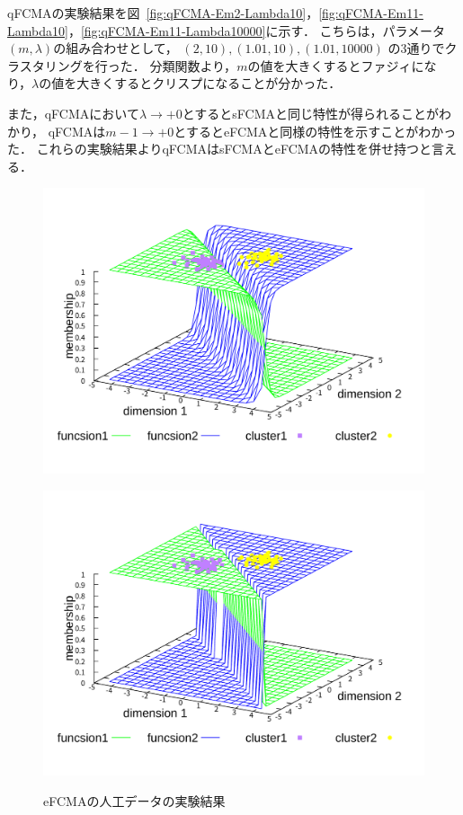 \documentclass[twocolumn, a4paper]{icethesisabst}
\begin{document}
qFCMAの実験結果を図~\ref{fig:qFCMA-Em2-Lambda10}，\ref{fig:qFCMA-Em11-Lambda10}，\ref{fig:qFCMA-Em11-Lambda10000}に示す．
こちらは，パラメータ$(m, \lambda)$の組み合わせとして，
$(2, 10), (1.01, 10), (1.01, 10000)$
の3通りでクラスタリングを行った．
分類関数より，$m$の値を大きくするとファジィになり，$\lambda$の値を大きくするとクリスプになることが分かった．

また，qFCMAにおいて$\lambda\rightarrow+0$とするとsFCMAと同じ特性が得られることがわかり，
qFCMAは$m-1\rightarrow+0$とするとeFCMAと同様の特性を示すことがわかった．
これらの実験結果よりqFCMAはsFCMAとeFCMAの特性を併せ持つと言える．

\begin{figure}[htbp]
 \centering
 \begin{minipage}{0.43\hsize}
  \includegraphics[width=\linewidth]{eFCMA-Lambda1.pdf}
  \label{fig:eFCMA-Lambda1}
 \end{minipage}
 \begin{minipage}{0.43\hsize}
  \includegraphics[width=\linewidth]{eFCMA-Lambda10000.pdf}
  \label{fig:eFCMA-Lambda10000}
 \end{minipage}
 \caption{eFCMAの人工データの実験結果}
\end{figure}
\end{document}
